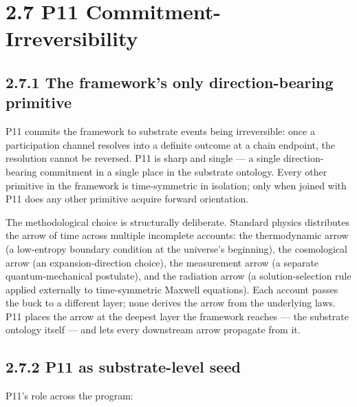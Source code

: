 \documentclass[11pt]{book}
\begin{document}
\section{2.7 P11 Commitment-Irreversibility}

\subsection{2.7.1 The framework's only direction-bearing primitive}

P11 commits the framework to substrate events being irreversible: once a participation channel resolves into a definite outcome at a chain endpoint, the resolution cannot be reversed. P11 is sharp and single — a single direction-bearing commitment in a single place in the substrate ontology. Every other primitive in the framework is time-symmetric in isolation; only when joined with P11 does any other primitive acquire forward orientation.

The methodological choice is structurally deliberate. Standard physics distributes the arrow of time across multiple incomplete accounts: the thermodynamic arrow (a low-entropy boundary condition at the universe's beginning), the cosmological arrow (an expansion-direction choice), the measurement arrow (a separate quantum-mechanical postulate), and the radiation arrow (a solution-selection rule applied externally to time-symmetric Maxwell equations). Each account passes the buck to a different layer; none derives the arrow from the underlying laws. P11 places the arrow at the deepest layer the framework reaches — the substrate ontology itself — and lets every downstream arrow propagate from it.

\subsection{2.7.2 P11 as substrate-level seed}

P11's role across the program:
\end{document}
